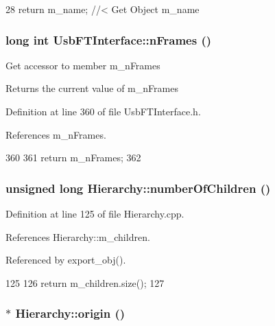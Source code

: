 \begin{DoxyCode}
28 { return m_name; } //< Get Object m_name
\end{DoxyCode}
\hypertarget{classUsbFTInterface_a694f5cb1d38d4369a597ad6761762c0e}{
\subsubsection[{nFrames}]{\setlength{\rightskip}{0pt plus 5cm}long int UsbFTInterface::nFrames ()}}
\label{classUsbFTInterface_a694f5cb1d38d4369a597ad6761762c0e}
Get accessor to member m\_\-nFrames \begin{DoxyReturn}{Returns}
the current value of m\_\-nFrames 
\end{DoxyReturn}


Definition at line 360 of file UsbFTInterface.h.

References m\_\-nFrames.


\begin{DoxyCode}
360                       {
361     return m_nFrames;
362   }
\end{DoxyCode}
\hypertarget{classHierarchy_ab16e84de65fd84e14001a6cf941c8be4}{
\subsubsection[{numberOfChildren}]{\setlength{\rightskip}{0pt plus 5cm}unsigned long Hierarchy::numberOfChildren ()}}
\label{classHierarchy_ab16e84de65fd84e14001a6cf941c8be4}


Definition at line 125 of file Hierarchy.cpp.

References Hierarchy::m\_\-children.

Referenced by export\_\-obj().


\begin{DoxyCode}
125                                            {
126   return m_children.size();
127 }
\end{DoxyCode}
\hypertarget{classHierarchy_aee461dc930ce3871636ff87f075b1b83}{
\subsubsection[{origin}]{$\ast$ Hierarchy::origin ()}}
\label{classHierarchy_aee461dc930ce3871636ff87f075b1b83}



